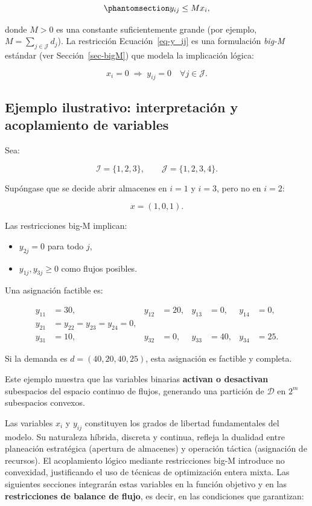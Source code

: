 \documentclass[
  spanish,
  us-letterpaper,
]{scrreprt}
\providecommand{\tightlist}{%
  \setlength{\itemsep}{0pt}\setlength{\parskip}{0pt}}
\numberwithin{equation}{section}
\begin{document}
\begin{equation}\phantomsection\label{eq-y_ij}{
y_{ij} \le M x_i,
}\end{equation}

donde \(M > 0\) es una constante suficientemente grande (por ejemplo,
\(M = \sum_{j \in \mathcal{J}} d_j\)). La restricción
Ecuación~\ref{eq-y_ij} es una formulación \emph{big-M} estándar (ver
Sección~\ref{sec-bigM}) que modela la implicación lógica:

\[
x_i = 0 \;\Rightarrow\; y_{ij} = 0 \quad \forall j \in \mathcal{J}.
\]

\subsection{\texorpdfstring{\textbf{Ejemplo ilustrativo: interpretación
y acoplamiento de
variables}}{Ejemplo ilustrativo: interpretación y acoplamiento de variables}}\label{sec-ejemplo-ilustrativo}

Sea:

\[
\mathcal{I} = \{1,2,3\}, \qquad \mathcal{J} = \{1,2,3,4\}.
\]

Supóngase que se decide abrir almacenes en \(i=1\) y \(i=3\), pero no en
\(i=2\):

\[
x = (1,0,1).
\]

Las restricciones big-M implican:

\begin{itemize}
\tightlist
\item
  \(y_{2j} = 0\) para todo \(j\),
\item
  \(y_{1j}, y_{3j} \ge 0\) como flujos posibles.
\end{itemize}

Una asignación factible es:

\[
\begin{aligned}
y_{11} &= 30, & y_{12} &= 20, & y_{13} &= 0, & y_{14} &= 0, \\
y_{21} &= y_{22} = y_{23} = y_{24} = 0, \\
y_{31} &= 10, & y_{32} &= 0, & y_{33} &= 40, & y_{34} &= 25.
\end{aligned}
\]

Si la demanda es \(d = (40,20,40,25)\), esta asignación es factible y
completa.

Este ejemplo muestra que las variables binarias \textbf{activan o
desactivan} subespacios del espacio continuo de flujos, generando una
partición de \(\mathcal{D}\) en \(2^m\) subespacios convexos.

Las variables \(x_i\) y \(y_{ij}\) constituyen los grados de libertad
fundamentales del modelo. Su naturaleza híbrida, discreta y continua,
refleja la dualidad entre planeación estratégica (apertura de almacenes)
y operación táctica (asignación de recursos). El acoplamiento lógico
mediante restricciones big-M introduce no convexidad, justificando el
uso de técnicas de optimización entera mixta. Las siguientes secciones
integrarán estas variables en la función objetivo y en las
\textbf{restricciones de balance de flujo}, es decir, en las condiciones
que garantizan:
\end{document}
